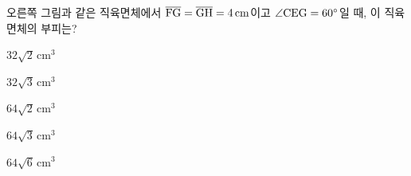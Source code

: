 \noindent\begin{minipage}[t]{0.58\linewidth}\vspace{0pt}\raggedright 오른쪽 그림과 같은 직육면체에서 $\overline{\mathrm{FG}}=\overline{\mathrm{GH}}=4\,\mathrm{cm}$이고 $\angle\mathrm{CEG}=60^\circ$일 때, 이 직육면체의 부피는?\end{minipage}\hfill\begin{minipage}[t]{0.4\linewidth}\vspace{0pt}\centering \resizebox{\ifdim\width>\linewidth\linewidth\else\width\fi}{!}{}\end{minipage}\par
\begin{choicesii}{\rule[-3ex]{0pt}{8ex}$32\sqrt{2}\,\mathrm{cm}^3$}{\rule[-3ex]{0pt}{8ex}$32\sqrt{3}\,\mathrm{cm}^3$}{\rule[-3ex]{0pt}{8ex}$64\sqrt{2}\,\mathrm{cm}^3$}{\rule[-3ex]{0pt}{8ex}$64\sqrt{3}\,\mathrm{cm}^3$}{\rule[-3ex]{0pt}{8ex}$64\sqrt{6}\,\mathrm{cm}^3$}\end{choicesii}
